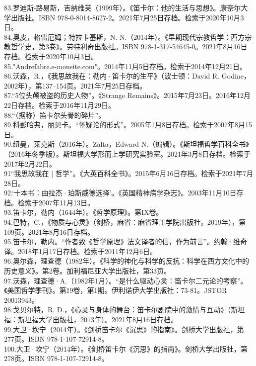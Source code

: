 83.罗迪斯-路易斯，吉纳维芙（1999年）。《笛卡尔：他的生活与思想》。康奈尔大学出版社。ISBN 978-0-8014-8627-2。2021年7月25日存档。检索于2020年10月3日。\\
84.奥皮，格雷厄姆；特拉卡基斯，N. N.（2014年）。《早期现代宗教哲学：西方宗教哲学史，第3卷》。劳特利奇出版社。ISBN 978-1-317-54645-0。2021年8月16日存档。检索于2020年10月3日。\\
85."Andrefabre.e-monsite.com"。2014年11月5日存档。检索于2014年12月21日。\\
86.沃森，R.，《我思故我在：勒内·笛卡尔的生平》（波士顿：David R. Godine，2002年），第137–154页。2021年7月25日存档。\\
87.“5位头颅被盗的历史人物”。《Strange Remains》。2015年7月23日。2016年12月22日存档。检索于2016年11月29日。\\
88.“（据称）笛卡尔头骨的碎片”。\\
89.科彭哈弗，丽贝卡。“怀疑论的形式”。2005年1月8日存档。检索于2007年8月15日。\\
90.纽曼，莱克斯（2016年）。Zalta，Edward N.（编辑）。《斯坦福哲学百科全书》（2016年冬季版）。斯坦福大学形而上学研究实验室。2021年3月8日存档。检索于2017年2月22日。\\
91“我思故我在 | 哲学”。《大英百科全书》。2015年6月16日存档。检索于2021年7月28日。\\
92.‘十本书：由拉杰·珀斯威德选择’。《英国精神病学杂志》。2003年11月10日存档。检索于2007年11月13日。\\
93.笛卡尔，勒内（1644年）。《哲学原理》。第IX卷。\\
94.巴特，C.，《物质与心灵》（剑桥，麻省：麻省理工学院出版社，2019年），第109页。2021年8月16日存档。\\
95.笛卡尔，勒内。“作者致《哲学原理》法文译者的信，作为前言”。约翰·维奇译。2018年1月17日存档。检索于2011年12月6日。\\
96.奥尔森，理查德（1982年）。《科学的神化与科学的反抗：科学在西方文化中的历史意义》。第2卷。加利福尼亚大学出版社，第33页。\\
97.沃森，理查德·A.（1982年1月）。“是什么驱动心灵：笛卡尔二元论的考察”。《美国哲学季刊》。第19卷，第1期。伊利诺伊大学出版社：73-81。JSTOR 20013943。\\
98.戈贝尔特，R. D.，《心灵与身体的舞台：笛卡尔剧院中的激情与互动》（斯坦福：斯坦福大学出版社，2013年）。2021年8月16日存档。\\
99.大卫·坎宁（2014年）。《剑桥笛卡尔《沉思》的指南》。剑桥大学出版社，第277页。ISBN 978-1-107-72914-8。\\
100.大卫·坎宁（2014年）。《剑桥笛卡尔《沉思》的指南》。剑桥大学出版社，第278页。ISBN 978-1-107-72914-8。\\
